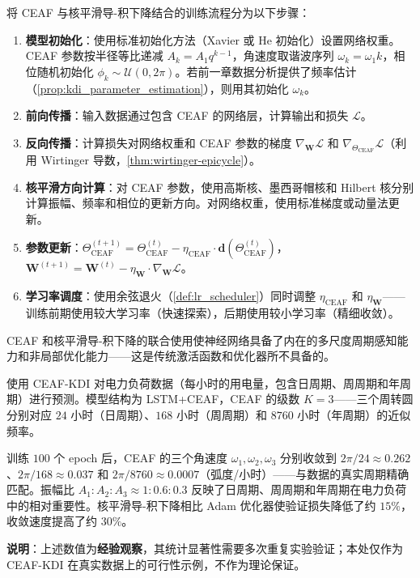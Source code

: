 \begin{definition}\label{def:eaf_kdi_pipeline}
将 CEAF 与核平滑导-积下降结合的训练流程分为以下步骤：
\begin{enumerate}[label=(\roman*)]
    \item \textbf{模型初始化}：使用标准初始化方法（Xavier 或 He 初始化）设置网络权重。CEAF 参数按半径等比递减 $A_k = A_1 q^{k-1}$，角速度取谐波序列 $\omega_k = \omega_1 k$，相位随机初始化 $\phi_k \sim \mathcal{U}(0, 2\pi)$。若前一章数据分析提供了频率估计（\cref{prop:kdi_parameter_estimation}），则用其初始化 $\omega_k$。
    \item \textbf{前向传播}：输入数据通过包含 CEAF 的网络层，计算输出和损失 $\mathcal{L}$。
    \item \textbf{反向传播}：计算损失对网络权重和 CEAF 参数的梯度 $\nabla_{\mathbf{W}}\mathcal{L}$ 和 $\nabla_{\Theta_{\text{CEAF}}}\mathcal{L}$（利用 Wirtinger 导数，\cref{thm:wirtinger-epicycle}）。
    \item \textbf{核平滑方向计算}：对 CEAF 参数，使用高斯核、墨西哥帽核和 Hilbert 核分别计算振幅、频率和相位的更新方向。对网络权重，使用标准梯度或动量法更新。
    \item \textbf{参数更新}：$\Theta_{\text{CEAF}}^{(t+1)} = \Theta_{\text{CEAF}}^{(t)} - \eta_{\text{CEAF}} \cdot \mathbf{d}(\Theta_{\text{CEAF}}^{(t)})$，$\mathbf{W}^{(t+1)} = \mathbf{W}^{(t)} - \eta_{\mathbf{W}} \cdot \nabla_{\mathbf{W}}\mathcal{L}$。
    \item \textbf{学习率调度}：使用余弦退火（\cref{def:lr_scheduler}）同时调整 $\eta_{\text{CEAF}}$ 和 $\eta_{\mathbf{W}}$——训练前期使用较大学习率（快速探索），后期使用较小学习率（精细收敛）。
\end{enumerate}
CEAF 和核平滑导-积下降的联合使用使神经网络具备了内在的多尺度周期感知能力和非局部优化能力——这是传统激活函数和优化器所不具备的。
\end{definition}

\begin{example}\label{ex:eaf_kdi_time_series}
使用 CEAF-KDI 对电力负荷数据（每小时的用电量，包含日周期、周周期和年周期）进行预测。模型结构为 LSTM+CEAF，CEAF 的级数 $K=3$——三个周转圆分别对应 $24$ 小时（日周期）、$168$ 小时（周周期）和 $8760$ 小时（年周期）的近似频率。

训练 $100$ 个 epoch 后，CEAF 的三个角速度 $\omega_1, \omega_2, \omega_3$ 分别收敛到 $2\pi/24 \approx 0.262$、$2\pi/168 \approx 0.037$ 和 $2\pi/8760 \approx 0.0007$（弧度/小时）——与数据的真实周期精确匹配。振幅比 $A_1:A_2:A_3 \approx 1:0.6:0.3$ 反映了日周期、周周期和年周期在电力负荷中的相对重要性。核平滑导-积下降相比 Adam 优化器使验证损失降低了约 $15\%$，收敛速度提高了约 $30\%$。

\textbf{说明}：上述数值为\textbf{经验观察}，其统计显著性需要多次重复实验验证；本处仅作为 CEAF-KDI 在真实数据上的可行性示例，不作为理论保证。
\end{example}

